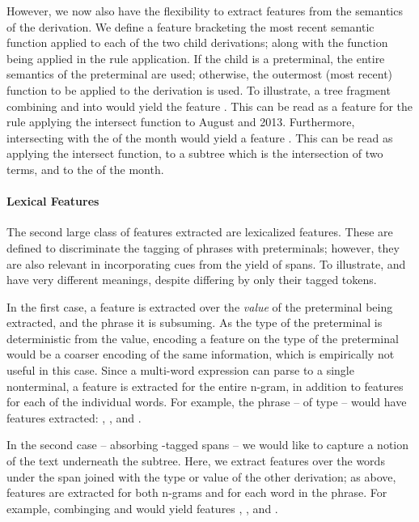 However, we now also have the flexibility to extract features from the
  semantics of the derivation.
We define a feature bracketing the most recent semantic function
  applied to each of the two child derivations; along with the function being
  applied in the rule application.
If the child is a preterminal, the entire semantics of the preterminal are used;
  otherwise, the outermost (most recent) function to be applied to the
  derivation is used.
To illustrate, a tree fragment combining  and  into
   would yield the feature .
This can be read as a feature for the rule applying the intersect function
  to August and 2013.
Furthermore, intersecting  with the  of the month would
  yield a feature .
This can be read as applying the intersect function, to a subtree which is
  the intersection of two terms, and to the  of the month.


\paragraph{Lexical Features}
The second large class of features extracted are lexicalized features.
These are defined to discriminate the tagging of phrases with preterminals;
  however, they are also relevant in incorporating cues from the yield
  of  spans.
To illustrate,  and  have very different meanings,
  despite differing by only their  tagged tokens.

In the first case, a feature is extracted over the \textit{value} of the
  preterminal being extracted, and the phrase it is subsuming.
As the type of the preterminal is deterministic from the value, encoding
  a feature on the type of the preterminal would be a coarser encoding of
  the same information, which is empirically not useful in this case.
Since a multi-word expression can parse to a single nonterminal, a feature
  is extracted for the entire n-gram, in addition to features for each of the
  individual words.
For example, the phrase  -- of type  -- would have
  features extracted:
  ,
  , and
  .

In the second case -- absorbing -tagged spans -- 
  we would like to capture a notion of the text underneath
  the subtree.
Here, we extract features over the words under the  span joined with
  the type or value of the other derivation;
  as above, features are extracted for both n-grams and for each word in
  the phrase.
For example, combinging  and  would yield features
  ,
  , and
  .

